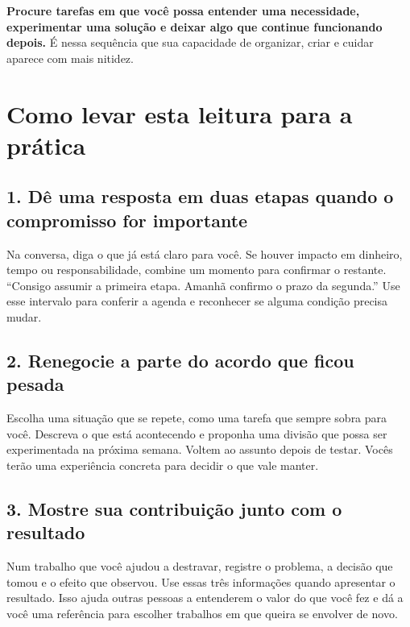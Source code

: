 \documentclass[11pt,a4paper]{article}
\begin{document}
\textbf{Procure tarefas em que você possa entender uma necessidade, experimentar uma solução e deixar algo que continue funcionando depois.} É nessa sequência que sua capacidade de organizar, criar e cuidar aparece com mais nitidez.

\clearpage
\section*{Como levar esta leitura para a prática}

\subsection*{1. Dê uma resposta em duas etapas quando o compromisso for importante}
Na conversa, diga o que já está claro para você. Se houver impacto em dinheiro, tempo ou responsabilidade, combine um momento para confirmar o restante. “Consigo assumir a primeira etapa. Amanhã confirmo o prazo da segunda.” Use esse intervalo para conferir a agenda e reconhecer se alguma condição precisa mudar.

\subsection*{2. Renegocie a parte do acordo que ficou pesada}
Escolha uma situação que se repete, como uma tarefa que sempre sobra para você. Descreva o que está acontecendo e proponha uma divisão que possa ser experimentada na próxima semana. Voltem ao assunto depois de testar. Vocês terão uma experiência concreta para decidir o que vale manter.

\subsection*{3. Mostre sua contribuição junto com o resultado}
Num trabalho que você ajudou a destravar, registre o problema, a decisão que tomou e o efeito que observou. Use essas três informações quando apresentar o resultado. Isso ajuda outras pessoas a entenderem o valor do que você fez e dá a você uma referência para escolher trabalhos em que queira se envolver de novo.
\end{document}
